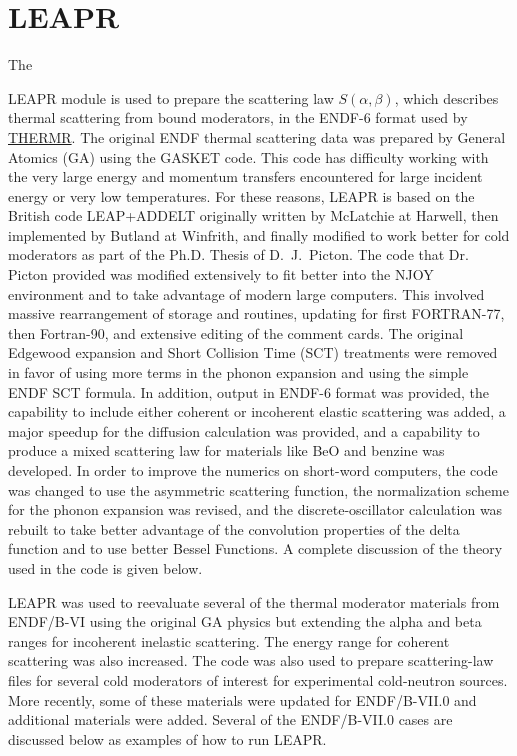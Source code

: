 \section{LEAPR}
\label{sLEAPR}

\hypertarget{sLEAPRhy}{The}
LEAPR module is used to prepare the scattering law
$S(\alpha,\beta)$, which describes thermal
scattering from bound moderators, in the
ENDF-6 format used by
\hyperlink{sTHERMRhy}{THERMR}.  The original ENDF thermal
scattering data\cite{GAreport} was prepared by General Atomics (GA)
using the GASKET code\cite{GASKET}.  This code has difficulty working
with the very large energy and momentum transfers encountered for
large incident energy or very low temperatures.  For these reasons,
LEAPR is based on the British code LEAP+ADDELT originally written
by McLatchie at Harwell\cite{McLatchie}, then
implemented by Butland at Winfrith\cite{Butland},
and finally modified to work better for cold moderators as part of
the Ph.D. Thesis of D.~J.~Picton\cite{Picton}.  The
code that Dr. Picton provided
was modified extensively to fit better into the NJOY environment
and to take advantage of modern large computers.  This involved
massive rearrangement of storage and routines, updating for first
FORTRAN-77,  then Fortran-90, and extensive editing of the comment
cards.  The original Edgewood expansion and Short Collision
Time (SCT) treatments were removed in favor of using more terms
in the phonon expansion and using the simple ENDF SCT
formula\cite{ENDF102}. In
addition, output in ENDF-6 format\cite{ENDF102} was provided, the
capability to include either coherent or incoherent elastic scattering
was added,  a major
speedup for the diffusion calculation was provided, and a capability
to produce a mixed scattering law for materials like BeO
and benzine was developed.  In order to improve the numerics
on short-word computers, the code was changed to use the asymmetric
scattering function, the normalization scheme for the phonon
expansion was revised, and the discrete-oscillator calculation
was rebuilt to take better advantage of the convolution properties
of the delta function and to use better Bessel Functions.  A complete
discussion of the theory used in the code is given below.

LEAPR was used\cite{New} to reevaluate several of the thermal moderator
materials from ENDF/B-VI using the original GA
physics\cite{GAreport} but extending the alpha and beta ranges for
incoherent inelastic scattering.  The
energy range for coherent scattering was also increased.  The code
was also used to prepare scattering-law files for several cold
moderators of interest for experimental
cold-neutron sources\cite{ICANS,coldworkshop}.  More recently, some
of these materials were updated for ENDF/B-VII.0
and additional materials were added.  Several of the ENDF/B-VII.0 cases
are discussed below as examples of how to run LEAPR.

